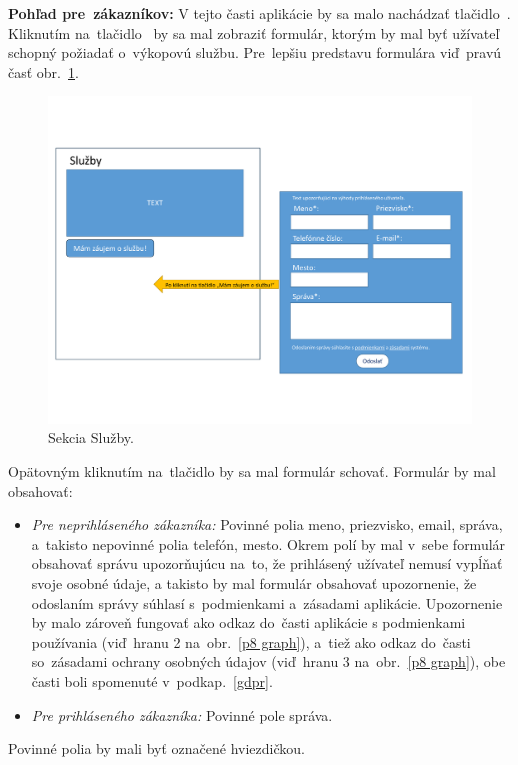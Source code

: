 \textbf{Pohľad pre~zákazníkov:} V tejto časti aplikácie by sa malo nachádzať tlačidlo~. Kliknutím na~tlačidlo~ by sa mal zobraziť formulár, ktorým by mal byť užívateľ schopný požiadať o~výkopovú službu. Pre~lepšiu predstavu formulára viď~pravú časť obr.~\ref{services}.

\begin{figure}[H]\centering
\includegraphics[width=140mm]{../img/UI concept/services}
\caption{Sekcia Služby.}
\label{services}
\end{figure}

Opätovným kliknutím na~tlačidlo by sa mal formulár schovať. Formulár by mal obsahovať:
\begin{itemize}
\item \textit{Pre neprihláseného zákazníka:}
Povinné polia meno, priezvisko, email, správa, a~takisto nepovinné polia telefón, mesto. Okrem polí by mal v~sebe formulár obsahovať správu upozorňujúcu na~to, že prihlásený užívateľ nemusí vypĺňať svoje osobné údaje, a takisto by mal formulár obsahovať upozornenie, že odoslaním správy súhlasí s~podmienkami a~zásadami aplikácie. Upozornenie by malo zároveň fungovať ako odkaz do~časti aplikácie s podmienkami používania (viď~hranu 2 na~obr.~\ref{p8 graph}), a~tiež ako odkaz do~časti so~zásadami ochrany osobných údajov (viď~hranu 3 na~obr.~\ref{p8 graph}), obe časti boli spomenuté v~podkap.~\ref{gdpr}.
\item \textit{Pre prihláseného zákazníka:}
Povinné pole správa.
\end{itemize}
Povinné polia by mali byť označené hviezdičkou.

